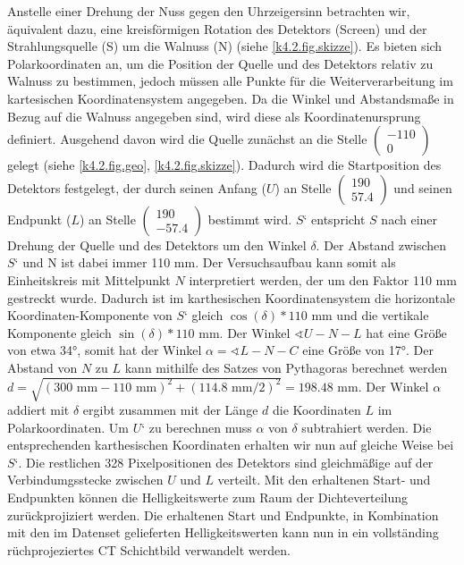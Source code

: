 Anstelle einer Drehung der Nuss gegen den Uhrzeigersinn betrachten wir, äquivalent dazu, eine kreisförmigen Rotation des Detektors (Screen) und der Strahlungsquelle (S) um die Walnuss (N) (siehe \cref{k4.2.fig.skizze}). Es bieten sich Polarkoordinaten an, um die Position der Quelle und des Detektors relativ zu Walnuss zu bestimmen, jedoch müssen alle Punkte für die Weiterverarbeitung im kartesischen Koordinatensystem angegeben. Da die Winkel und Abstandsmaße in Bezug auf die Walnuss angegeben sind, wird diese als Koordinatenursprung definiert. Ausgehend davon wird die Quelle zunächst an die Stelle $\begin{pmatrix}-110\\ 0 \end{pmatrix}$   gelegt (siehe \cref{k4.2.fig.geo}, \cref{k4.2.fig.skizze}). Dadurch wird die Startposition des Detektors festgelegt, der durch seinen Anfang ($U$) an Stelle $\begin{pmatrix}190\\ 57.4 \end{pmatrix}$ und seinen Endpunkt ($L$) an Stelle $\begin{pmatrix}190\\ -57.4 \end{pmatrix}$ bestimmt wird. 
$S‘$ entspricht $S$ nach einer Drehung der Quelle und des Detektors um den Winkel $\delta$. Der Abstand zwischen $S‘$ und $\mathrm{N}$ ist dabei immer 110 mm. Der Versuchsaufbau kann somit als Einheitskreis mit Mittelpunkt $N$ interpretiert werden, der um den Faktor 110 mm gestreckt wurde. Dadurch ist im karthesischen Koordinatensystem die horizontale Koordinaten-Komponente von $S‘$ gleich $\cos(\delta) * 110\text{ mm}$ und die vertikale Komponente gleich $\sin(\delta) * 110\text{ mm}$.
Der Winkel $\sphericalangle U-N-L$ hat eine Größe von etwa 34°, somit hat der Winkel $\alpha = \sphericalangle L-N-C$ eine Größe von 17°. Der Abstand von $N$ zu $L$ kann mithilfe des Satzes von Pythagoras berechnet werden $d = \sqrt{(300\text{ mm} - 110\text{ mm})^2+(114.8\text{ mm}/2)^2} = 198.48\text{ mm}$.
Der Winkel $\alpha$ addiert mit $\delta$ ergibt zusammen mit der Länge $d$ die Koordinaten $L$ im Polarkoordinaten. Um $U‘$ zu berechnen muss $\alpha$ von $\delta$ subtrahiert werden. Die entsprechenden karthesischen Koordinaten erhalten wir nun auf gleiche Weise bei $S‘$. Die restlichen 328 Pixelpositionen des Detektors sind gleichmäßige auf der Verbindumgsstecke zwischen $U$ und $L$ verteilt.
Mit den erhaltenen Start- und Endpunkten können die Helligkeitswerte zum Raum der Dichteverteilung zurückprojiziert werden.
Die erhaltenen Start und Endpunkte, in Kombination mit den im Datenset gelieferten Helligkeitswerten kann nun in ein vollständing rüchprojeziertes CT Schichtbild verwandelt werden.


